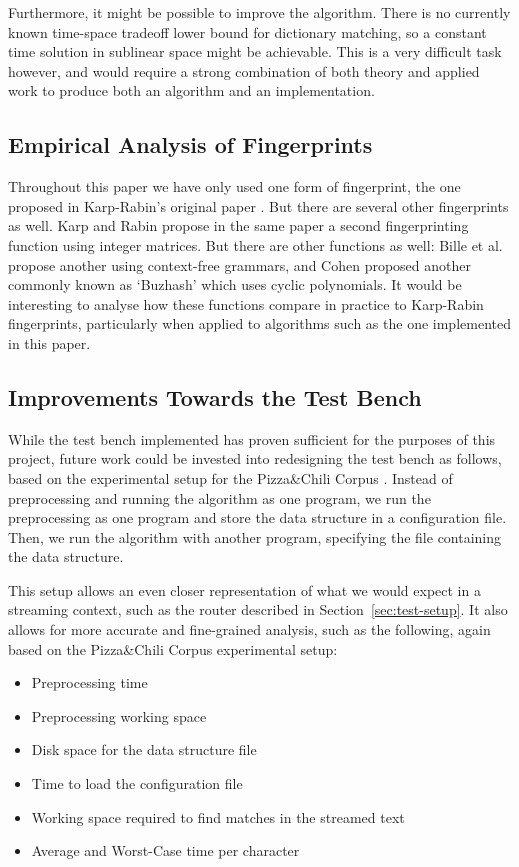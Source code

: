 \documentclass[ %
                    author={Dominic Joseph Moylett},
                    degree={MEng},
                     title={Dictionary Matching with Fingerprints},
                  subtitle={An Empirical Analysis},
                      type={research},
                      year={2015} ]{dissertation}
\begin{document}
Furthermore, it might be possible to improve the algorithm. There is no currently known time-space tradeoff lower bound for dictionary matching, so a constant time solution in sublinear space might be achievable. This is a very difficult task however, and would require a strong combination of both theory and applied work to produce both an algorithm and an implementation.

\subsection{Empirical Analysis of Fingerprints}

Throughout this paper we have only used one form of fingerprint, the one proposed in Karp-Rabin's original paper \cite{5390135}. But there are several other fingerprints as well. Karp and Rabin propose in the same paper a second fingerprinting function using integer matrices. But there are other functions as well: Bille et al.\@ \cite{DBLP:journals/corr/abs-1305-2777} propose another using context-free grammars, and Cohen \cite{Cohen:1997:RHF:256163.256168} proposed another commonly known as `Buzhash' which uses cyclic polynomials. It would be interesting to analyse how these functions compare in practice to Karp-Rabin fingerprints, particularly when applied to algorithms such as the one implemented in this paper.

\subsection{Improvements Towards the Test Bench}

While the test bench implemented has proven sufficient for the purposes of this project, future work could be invested into redesigning the test bench as follows, based on the experimental setup for the Pizza\&Chili Corpus \cite{website:pizza-setup}. Instead of preprocessing and running the algorithm as one program, we run the preprocessing as one program and store the data structure in a configuration file. Then, we run the algorithm with another program, specifying the file containing the data structure.

This setup allows an even closer representation of what we would expect in a streaming context, such as the router described in Section~\ref{sec:test-setup}. It also allows for more accurate and fine-grained analysis, such as the following, again based on the Pizza\&Chili Corpus experimental setup:

\begin{itemize}
  \item Preprocessing time
  \item Preprocessing working space
  \item Disk space for the data structure file
  \item Time to load the configuration file
  \item Working space required to find matches in the streamed text
  \item Average and Worst-Case time per character
\end{itemize}
\end{document}
